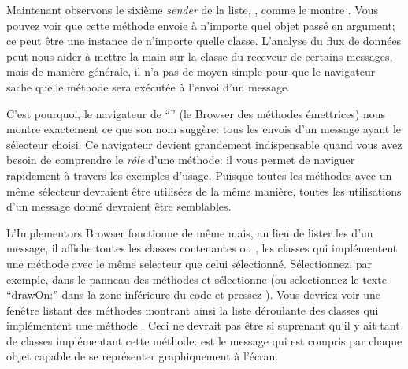 \documentclass[a4paper,10pt,twoside]{book}
\begin{document}
Maintenant observons le sixième \emph{sender} de la liste,
, comme le montre .
Vous pouvez voir que cette méthode envoie  à n'importe quel objet 
passé en argument; ce peut être une instance de n'importe quelle classe.
L'analyse du flux de données peut nous aider à mettre la main sur la classe du 
receveur de certains messages, mais de manière générale, il n'a pas de moyen simple 
pour que le navigateur sache quelle méthode sera exécutée à l'envoi d'un message.

C'est pourquoi, le navigateur de ``\senders'' (\ie le Browser des
méthodes émettrices) nous montre exactement ce que son nom
suggère: tous les envois d'un message ayant  le
sélecteur choisi. %
Ce navigateur devient grandement indispensable quand vous avez besoin
de comprendre le \emph{rôle} d'une méthode: il vous permet de
naviguer rapidement à travers les exemples d'usage. %
Puisque toutes les méthodes avec un même sélecteur devraient être utilisées de la même manière, toutes les utilisations d'un message donné devraient être semblables.


L'Implementors Browser fonctionne de même mais, au lieu de
lister les \senders d'un message, il affiche toutes les classes
contenantes ou \implementors, \ie les classes qui implémentent une
méthode avec le même selecteur
que celui sélectionné.
Sélectionnez, par exemple,  dans le panneau des méthodes
et sélectionne  (ou selectionnez le
texte ``drawOn:'' dans la zone inférieure du code et pressez 
).
Vous devriez voir une fenêtre listant des méthodes montrant ainsi la
liste déroulante des  %
classes qui implémentent une méthode .
Ceci ne devrait pas être si suprenant qu'il y ait tant de classes
implémentant cette méthode:  est le message qui est
compris par chaque objet capable de se représenter graphiquement à
l'écran.
\end{document}
